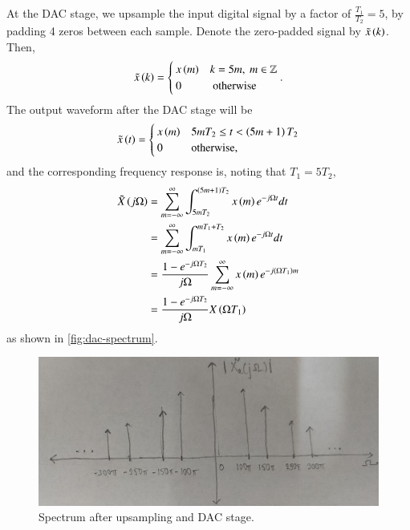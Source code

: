 \documentclass[journal,12pt,twocolumn]{IEEEtran}
\begin{document}
\begin{enumerate}[label=\theenumi.]
    At the DAC stage, we upsample the input digital signal by a factor of
    \(\frac{T_1}{T_2} = 5\), by padding 4 zeros between each sample. Denote the
    zero-padded signal by \(\tilde{x}\left(k\right)\). Then,
    \begin{equation}
        \tilde{x}\left(k\right) =
        \begin{cases}
            x\left(m\right) & k = 5m,\ m \in \mathbb{Z} \\
            0 & \text{ otherwise}
        \end{cases}.
        \label{eq:x-tilde}
    \end{equation}
    The output waveform after the DAC stage will be
    \begin{equation}
        \tilde{x}\left(t\right) =
        \begin{cases}
            x\left(m\right) & 5mT_2 \le t < \left(5m+1\right)T_2 \\
            0 & \text{otherwise},
        \end{cases}
    \end{equation}
    and the corresponding frequency response is, noting that \(T_1 = 5T_2\),
    \begin{align}
        \tilde{X}\left(j\Omega\right) &= \sum_{m=-\infty}^{\infty}\int_{5mT_2}^{\left(5m+1\right)T_2}x\left(m\right)e^{-j\Omega{}t}dt \\
        &= \sum_{m=-\infty}^{\infty}\int_{mT_1}^{mT_1+T_2}x\left(m\right)e^{-j\Omega{}t}dt \\
        &= \frac{1-e^{-j\Omega{}T_2}}{j\Omega}\sum_{m=-\infty}^{\infty}x\left(m\right)e^{-j\left(\Omega{}T_1\right)m} \\
        &= \frac{1-e^{-j\Omega{}T_2}}{j\Omega}X\left(\Omega{}T_1\right)
        \label{eq:freq-resp-dac}
    \end{align}
    as shown in \autoref{fig:dac-spectrum}.

    \begin{figure}[!ht]
        \centering
        \includegraphics[width=\columnwidth]{figs/dac-spectrum.jpg}
        \caption{Spectrum after upsampling and DAC stage.}
        \label{fig:dac-spectrum}
    \end{figure}


\end{enumerate}
\end{document}
